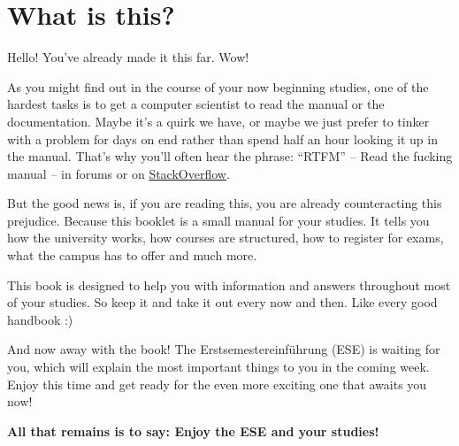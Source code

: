 \chapter{What is this?}

Hello! You've already made it this far. Wow!

As you might find out in the course of your now beginning studies, 
one of the hardest tasks is to get a computer scientist to read the manual or the documentation. 
Maybe it's a quirk we have, or maybe we just prefer to tinker with a problem for days on end rather than spend half an hour looking it up in the manual. 
That's why you'll often hear the phrase: \enquote{RTFM} -- Read the fucking manual -- 
in forums or on \href{https://stackoverflow.com/}{StackOverflow}.

But the good news is, if you are reading this, you are already counteracting this prejudice. 
Because this booklet is a small manual for your studies. It tells you how the university works, how courses are structured, how to register for exams, what the campus has to offer and much more. 



This book is designed to help you with information and answers throughout most of your studies. 
So keep it and take it out every now and then. Like every good handbook :)

And now away with the book! The Erstsemestereinführung (ESE) is waiting for you, which will explain the most important things to you in the coming week. Enjoy this time and get ready for the even more exciting one that awaits you now!

\textbf{All that remains is to say: Enjoy the ESE and your studies!}

